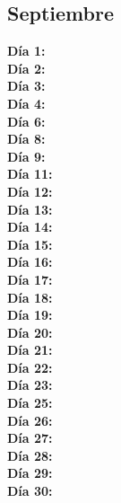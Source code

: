 \subsection{Septiembre}
\textbf{Día 1:} \\
\textbf{Día 2:} \\
\textbf{Día 3:} \\
\textbf{Día 4:} \\
\textbf{Día 6:} \\
\textbf{Día 8:} \\
\textbf{Día 9:} \\
\textbf{Día 11:} \\
\textbf{Día 12:} \\
\textbf{Día 13:} \\
\textbf{Día 14:} \\
\textbf{Día 15:} \\
\textbf{Día 16:} \\
\textbf{Día 17:} \\
\textbf{Día 18:} \\
\textbf{Día 19:} \\
\textbf{Día 20:} \\
\textbf{Día 21:} \\
\textbf{Día 22:} \\
\textbf{Día 23:} \\
\textbf{Día 25:} \\
\textbf{Día 26:} \\
\textbf{Día 27:} \\
\textbf{Día 28:} \\
\textbf{Día 29:} \\
\textbf{Día 30:} \\


